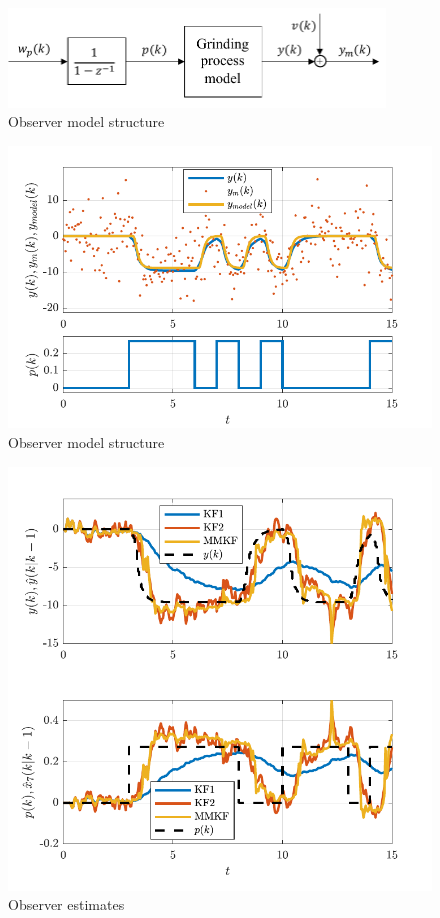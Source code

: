 \begin{figure}[htp]
	\centering
	\includegraphics[width=10cm]{images/obs-model-diag.pdf}
	\caption{Observer model structure}
	\label{fig:obs_model}
\end{figure}

\begin{figure}[htp]
	\centering
	\includegraphics[width=12cm]{images/rod_obs_sim_1_ioplot_P2DcTd4.pdf}
	\caption{Observer model structure}
	\label{fig:rod_obs_sim_1_ioplot_P2DcTd4}
\end{figure}

\begin{figure}[htp]
	\centering
	\includegraphics[width=12cm]{images/rod_obs_sim_1_est_P2DcTd4.pdf}
	\caption{Observer estimates}
	\label{fig:rod_obs_sim_1_est_P2DcTd4}
\end{figure}

